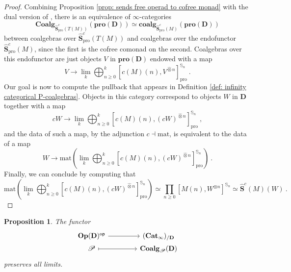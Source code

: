 \documentclass[a4paper,12pt]{amsart}
\theoremstyle{plain}
\newtheorem{proposition}[theorem]{Proposition}%
\theoremstyle{definition}
\theoremstyle{remark}
\begin{document}
\begin{proof}
Combining Proposition \ref{prop: sends free operad to cofree monad} with the dual version of \cite[Remark B.4]{pdalgebras}, there is an equivalence of $\infty$-categories
\[
\mathbf{Coalg}_{\widehat{\mathbf{S}}^c_{\mathrm{pro}}(T(M))}(\mathbf{pro}(\mathbf{D})) \simeq \mathbf{coalg}_{\widehat{\mathbf{S}}^c_{\mathrm{pro}}(M)}(\mathbf{pro}(\mathbf{D}))
\]
between coalgebras over $\widehat{\mathbf{S}}^c_{\mathrm{pro}}(T(M))$ and coalgebras over the endofunctor $\widehat{\mathbf{S}}^c_{\mathrm{pro}}(M)$, since the first is the cofree comonad on the second. Coalgebras over this endofunctor are just objects $V$ in $\mathbf{pro}(\mathbf{D})$ endowed with a map 
\[
V \longrightarrow \lim_k \bigoplus_{n \geq 0}^{k} \left[c(M)(n),V^{\widehat{\otimes} n} \right]^{\mathbb{S}_n}_{\mathrm{pro}}~. 
\]
Our goal is now to compute the pullback that appears in Definition \ref{def: infinity categorical P-coalgebras}. Objects in this category correspond to objects $W$ in $\mathbf{D}$ together with a map
\[
cW \longrightarrow \lim_k \bigoplus_{n \geq 0}^{k} \left[c(M)(n),(cW)^{\widehat{\otimes} n} \right]^{\mathbb{S}_n}_{\mathrm{pro}}~,
\]
and the data of such a map, by the adjunction $c \dashv \mathrm{mat}$, is equivalent to the data of a map
\[
W \longrightarrow \mathrm{mat}\left(\lim_k \bigoplus_{n \geq 0}^{k} \left[c(M)(n),(cW)^{\widehat{\otimes} n} \right]^{\mathbb{S}_n}_{\mathrm{pro}}\right)~. 
\]
Finally, we can conclude by computing that
\[
\mathrm{mat}\left(\lim_k \bigoplus_{n \geq 0}^{k} \left[c(M)(n),(cW)^{\widehat{\otimes} n} \right]^{\mathbb{S}_n}_{\mathrm{pro}}\right) \simeq \prod_{n \geq 0} \left[M(n),W^{\otimes n} \right]^{\mathbb{S}_n} \simeq \widehat{\mathbf{S}}^c(M)(W)~. 
\]
\end{proof}

\begin{proposition}\label{prop: taking infinity categories of coalgebras preserves limits}
The functor 
\[
\begin{tikzcd}[column sep=3.5pc,row sep= 0pc]
\mathbf{Op}(\mathbf{D})^{\mathsf{op}} \arrow[r]
&(\mathbf{Cat}_\infty)_{/\mathbf{D}} \\
\mathscr{P} \arrow[r,mapsto]
&\mathbf{Coalg}_\mathscr{P}(\mathbf{D})
\end{tikzcd}
\]
preserves all limits.
\end{proposition}
\end{document}
